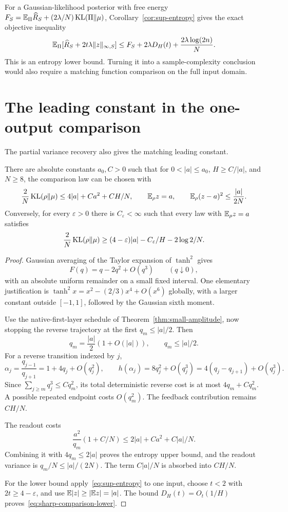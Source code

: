 For a Gaussian-likelihood posterior with free energy
$F_S=\mathbb E_\Pi\widehat R_S+(2\lambda/N)\operatorname{KL}(\Pi\|\mu)$,
Corollary~\ref{cor:sup-entropy} gives the exact objective inequality
\[
 \mathbb E_\Pi[\widehat R_S+2t\lambda\|z\|_{\infty,S}]
 \le F_S+2\lambda D_H(t)+\frac{2\lambda\log(2n)}N.
\]
This is an entropy lower bound. Turning it into a sample-complexity conclusion would also require a matching function comparison on the full input domain.

\section{The leading constant in the one-output comparison}
\label{sec:sharp-comparison}
The partial variance recovery also gives the matching leading constant.

\begin{theorem}
\label{thm:sharp-comparison}
There are absolute constants $a_0,C>0$ such that for
$0<|a|\le a_0$, $H\ge C/|a|$, and $N\ge8$, the comparison law can be chosen with
\begin{equation}
 \frac2N\operatorname{KL}(\rho\|\mu)
 \le4|a|+Ca^2+CH/N,
 \qquad \mathbb E_\rho z=a,\qquad
 \mathbb E_\rho(z-a)^2\le\frac{|a|}{2N}.
 \label{eq:sharp-comparison}
\end{equation}
Conversely, for every $\varepsilon>0$ there is $C_\varepsilon<\infty$ such that every law with $\mathbb E_\rho z=a$ satisfies
\begin{equation}
 \frac2N\operatorname{KL}(\rho\|\mu)
 \ge(4-\varepsilon)|a|-C_\varepsilon/H-2\log2/N.
 \label{eq:sharp-comparison-lower}
\end{equation}
\end{theorem}
\begin{proof}
Gaussian averaging of the Taylor expansion of $\tanh^2$ gives
\[
 F(q)=q-2q^2+O(q^3)\qquad(q\downarrow0),
\]
with an absolute uniform remainder on a small fixed interval. One elementary justification is
$\tanh^2x=x^2-(2/3)x^4+O(x^6)$ globally, with a larger constant outside $[-1,1]$, followed by the Gaussian sixth moment.

Use the native-first-layer schedule of Theorem~\ref{thm:small-amplitude}, now stopping the reverse trajectory at the first $q_m\le|a|/2$. Then
\[
 q_m=\frac{|a|}{2}(1+O(|a|)),\qquad q_m\le|a|/2.
\]
For a reverse transition indexed by $j$,
\[
 \alpha_j=\frac{q_{j-1}}{q_{j+1}}=1+4q_j+O(q_j^2),\qquad
 h(\alpha_j)=8q_j^2+O(q_j^3)
            =4(q_j-q_{j+1})+O(q_j^3).
\]
Since $\sum_{j\ge m}q_j^3\le Cq_m^2$, its total deterministic reverse cost is at most $4q_m+Cq_m^2$. A possible repeated endpoint costs $O(q_m^2)$. The feedback contribution remains $CH/N$.

The readout costs
\[
 \frac{a^2}{q_m}(1+C/N)
 \le2|a|+Ca^2+C|a|/N.
\]
Combining it with $4q_m\le2|a|$ proves the entropy upper bound, and the readout variance is $q_m/N\le|a|/(2N)$. The term $C|a|/N$ is absorbed into $CH/N$.

For the lower bound apply~\eqref{eq:sup-entropy} to one input, choose $t<2$ with $2t\ge4-\varepsilon$, and use $\mathbb E|z|\ge|\mathbb E z|=|a|$. The bound $D_H(t)=O_t(1/H)$ proves~\eqref{eq:sharp-comparison-lower}.
\end{proof}


